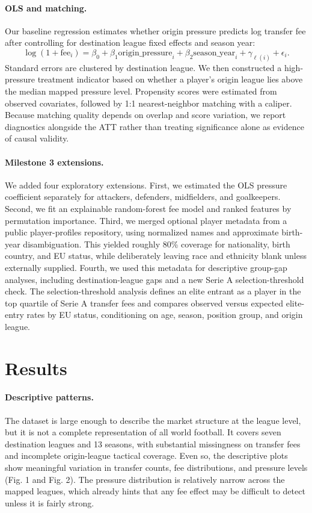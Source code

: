\documentclass[12pt]{article}
\begin{document}
\paragraph*{OLS and matching.} Our baseline regression estimates whether origin pressure predicts log transfer fee after controlling for destination league fixed effects and season year:
\[
\log(1+\mathrm{fee}_i)=\beta_0+\beta_1 \mathrm{origin\_pressure}_i+\beta_2 \mathrm{season\_year}_i+\gamma_{\ell(i)}+\epsilon_i.
\]
Standard errors are clustered by destination league. We then constructed a high-pressure treatment indicator based on whether a player's origin league lies above the median mapped pressure level. Propensity scores were estimated from observed covariates, followed by 1:1 nearest-neighbor matching with a caliper. Because matching quality depends on overlap and score variation, we report diagnostics alongside the ATT rather than treating significance alone as evidence of causal validity.

\paragraph*{Milestone 3 extensions.} We added four exploratory extensions. First, we estimated the OLS pressure coefficient separately for attackers, defenders, midfielders, and goalkeepers. Second, we fit an explainable random-forest fee model and ranked features by permutation importance. Third, we merged optional player metadata from a public player-profiles repository, using normalized names and approximate birth-year disambiguation. This yielded roughly 80\% coverage for nationality, birth country, and EU status, while deliberately leaving race and ethnicity blank unless externally supplied. Fourth, we used this metadata for descriptive group-gap analyses, including destination-league gaps and a new Serie A selection-threshold check. The selection-threshold analysis defines an elite entrant as a player in the top quartile of Serie A transfer fees and compares observed versus expected elite-entry rates by EU status, conditioning on age, season, position group, and origin league.

\section*{Results}

\paragraph*{Descriptive patterns.} The dataset is large enough to describe the market structure at the league level, but it is not a complete representation of all world football. It covers seven destination leagues and 13 seasons, with substantial missingness on transfer fees and incomplete origin-league tactical coverage. Even so, the descriptive plots show meaningful variation in transfer counts, fee distributions, and pressure levels (Fig. 1 and Fig. 2). The pressure distribution is relatively narrow across the mapped leagues, which already hints that any fee effect may be difficult to detect unless it is fairly strong.
\end{document}
